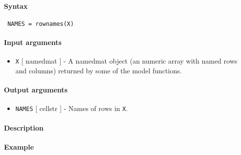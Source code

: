 


	\paragraph{Syntax}
 
 \begin{verbatim}
 NAMES = rownames(X)
 \end{verbatim}
 
 \paragraph{Input arguments}
 
 \begin{itemize}
 \item
   \texttt{X} {[} namedmat {]} - A namedmat object (an numeric array with
   named rows and columns) returned by some of the model functions.
 \end{itemize}
 
 \paragraph{Output arguments}
 
 \begin{itemize}
 \item
   \texttt{NAMES} {[} cellstr {]} - Names of rows in \texttt{X}.
 \end{itemize}
 
 \paragraph{Description}
 
 \paragraph{Example}


